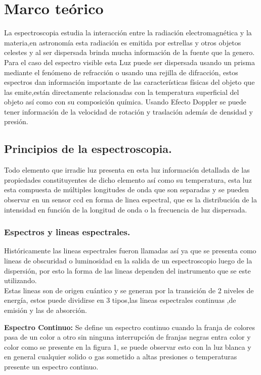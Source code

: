 \newpage
\chapter{Marco teórico}

La espectroscopia estudia la interacción entre la radiación electromagnética y la materia,en astronomía esta radiación es emitida por estrellas y otros objetos celestes y al ser dispersada brinda mucha información de la fuente que la genero.\\
Para el caso del espectro visible esta Luz puede ser dispersada usando un prisma mediante el fenómeno de refracción o usando una rejilla de difracción, estos espectros dan información importante de las características físicas del objeto que las emite,están directamente relacionadas con la temperatura superficial del objeto así como con su composición química. Usando Efecto Doppler se puede tener información de la velocidad de rotación y traslación además de densidad y presión. \cite{utilidad}\\



\section {Principios de la espectroscopia.}
Todo elemento que  irradie luz presenta en esta luz información detallada de las propiedades constituyentes de dicho elemento así como su temperatura, esta luz esta compuesta de múltiples longitudes de onda que son separadas y se pueden observar en un sensor ccd en forma de linea espectral, que es la distribución de  la intensidad en función de la longitud de onda o la frecuencia  de luz dispersada.

\subsection {Espectros y lineas espectrales.}

Históricamente las lineas espectrales fueron llamadas así ya que se  presenta como lineas de obscuridad o luminosidad en la salida de un espectroscopio luego de la dispersión, por esto la forma de las lineas dependen del instrumento que se este utilizando.\\
Estas lineas son de origen cuántico y se generan por la transición de 2 niveles de energía, estos puede dividirse en 3 tipos,las lineas espectrales continuas ,de emisión y las de absorción.\cite{troccoli}


\textbf{Espectro Continuo:}
Se define un espectro continuo cuando la franja de colores  pasa de un color a otro sin ninguna interrupción de franjas negras entra color y color como se presente en la figura 1, se puede observar esto con la luz blanca y en general cualquier solido o gas sometido a altas presiones o temperaturas presente un espectro continuo.



